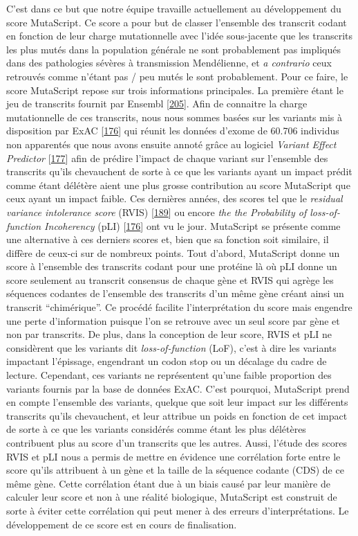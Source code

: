 \documentclass[12pt,a4paper,twoside]{ugathesis}
\theoremstyle{definition}
\theoremstyle{definition}
\theoremstyle{definition}
\theoremstyle{remark}
\begin{document}
C'est dans ce but que notre équipe travaille actuellement au
développement du score MutaScript. Ce score a pour but de classer
l'ensemble des transcrit codant en fonction de leur charge mutationnelle
avec l'idée sous-jacente que les transcrits les plus mutés dans la
population générale ne sont probablement pas impliqués dans des
pathologies sévères à transmission Mendélienne, et \emph{a contrario}
ceux retrouvés comme n'étant pas / peu mutés le sont probablement. Pour
ce faire, le score MutaScript repose sur trois informations principales.
La première étant le jeu de transcrits fournit par Ensembl
{[}\protect\hyperlink{ref-Aken2017}{205}{]}. Afin de connaitre la charge
mutationnelle de ces transcrits, nous nous sommes basées sur les
variants mis à disposition par ExAC
{[}\protect\hyperlink{ref-Lek2016}{176}{]} qui réunit les données
d'exome de 60.706 individus non apparentés que nous avons ensuite annoté
grâce au logiciel \emph{Variant Effect Predictor}
{[}\protect\hyperlink{ref-McLaren2016}{177}{]} afin de prédire l'impact
de chaque variant sur l'ensemble des transcrits qu'ils chevauchent de
sorte à ce que les variants ayant un impact prédit comme étant délétère
aient une plus grosse contribution au score MutaScript que ceux ayant un
impact faible. Ces dernières années, des scores tel que le
\emph{residual variance intolerance score} (RVIS)
{[}\protect\hyperlink{ref-Petrovski2013}{189}{]} ou encore \emph{the the
Probability of loss-of-function Incoherency} (pLI)
{[}\protect\hyperlink{ref-Lek2016}{176}{]} ont vu le jour. MutaScript se
présente comme une alternative à ces derniers scores et, bien que sa
fonction soit similaire, il diffère de ceux-ci sur de nombreux points.
Tout d'abord, MutaScript donne un score à l'ensemble des transcrits
codant pour une protéine là où pLI donne un score seulement au transcrit
consensus de chaque gène et RVIS qui agrège les séquences codantes de
l'ensemble des transcrits d'un même gène créant ainsi un transcrit
``chimérique''. Ce procédé facilite l'interprétation du score mais
engendre une perte d'information puisque l'on se retrouve avec un seul
score par gène et non par transcrits. De plus, dans la conception de
leur score, RVIS et pLI ne considèrent que les variants dit
\emph{loss-of-function} (LoF), c'est à dire les variants impactant
l'épissage, engendrant un codon stop ou un décalage du cadre de lecture.
Cependant, ces variants ne représentent qu'une faible proportion des
variants fournis par la base de données ExAC. C'est pourquoi, MutaScript
prend en compte l'ensemble des variants, quelque que soit leur impact
sur les différents transcrits qu'ils chevauchent, et leur attribue un
poids en fonction de cet impact de sorte à ce que les variants
considérés comme étant les plus délétères contribuent plus au score d'un
transcrits que les autres. Aussi, l'étude des scores RVIS et pLI nous a
permis de mettre en évidence une corrélation forte entre le score qu'ils
attribuent à un gène et la taille de la séquence codante (CDS) de ce
même gène. Cette corrélation étant due à un biais causé par leur manière
de calculer leur score et non à une réalité biologique, MutaScript est
construit de sorte à éviter cette corrélation qui peut mener à des
erreurs d'interprétations. Le développement de ce score est en cours de
finalisation.
\end{document}
